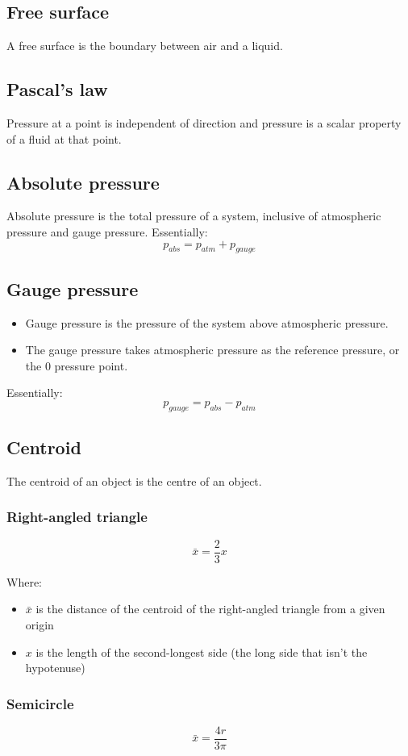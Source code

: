 \documentclass[11pt]{article}
\begin{document}
\subsection{Free surface}
\label{sec:orgb2518ea}
A free surface is the boundary between air and a liquid.
\subsection{Pascal's law}
\label{sec:org96dcc90}
Pressure at a point is independent of direction and pressure is a scalar property of a fluid at that point.
\subsection{Absolute pressure}
\label{sec:org1a409b9}
Absolute pressure is the total pressure of a system, inclusive of atmospheric pressure and gauge pressure. Essentially:
\[p_{abs} = p_{atm} + p_{gauge}\]
\subsection{Gauge pressure}
\label{sec:org7a01371}
\begin{itemize}
\item Gauge pressure is the pressure of the system above atmospheric pressure.
\item The gauge pressure takes atmospheric pressure as the reference pressure, or the 0 pressure point.
\end{itemize}

Essentially:
\[p_{gauge} = p_{abs} - p_{atm}\]
\subsection{Centroid}
\label{sec:org39e4330}
The centroid of an object is the centre of an object.
\subsubsection{Right-angled triangle}
\label{sec:orgad9ec9e}
\[\bar{x} = \frac{2}{3} x\]

Where:
\begin{itemize}
\item \(\bar{x}\) is the distance of the centroid of the right-angled triangle from a given origin
\item \(x\) is the length of the second-longest side (the long side that isn't the hypotenuse)
\end{itemize}
\subsubsection{Semicircle}
\label{sec:org1a7147f}
\[\bar{x} = \frac{4r}{3\pi}\]
\end{document}
